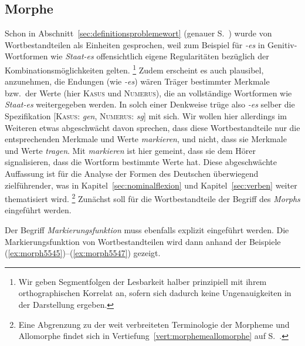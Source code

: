 \subsection{Morphe}

\label{sec:morphe}

Schon in Abschnitt~\ref{sec:definitionsproblemewort} (genauer S.~\pageref{arbref:9234645}) wurde von Wortbestandteilen als Einheiten gesprochen, weil zum Beispiel für \textit{-es} in Genitiv-Wortformen wie \textit{Staat-es} offensichtlich eigene Regularitäten bezüglich der Kombinationsmöglichkeiten gelten.%
\footnote{Wir geben Segmentfolgen der Lesbarkeit halber prinzipiell mit ihrem orthographischen Korrelat an, sofern sich dadurch keine Ungenauigkeiten in der Darstellung ergeben.}
Zudem erscheint es auch plausibel, anzunehmen, die Endungen (wie \textit{-es}) wären Träger bestimmter Merkmale bzw.\ der Werte (hier \textsc{Kasus} und \textsc{Numerus}), die an vollständige Wortformen wie \textit{Staat-es} weitergegeben werden.
In solch einer Denkweise trüge also \textit{-es} selber die Spezifikation [\textsc{Kasus}: \textit{gen}, \textsc{Numerus}: \textit{sg}] mit sich.
Wir wollen hier allerdings im Weiteren etwas abgeschwächt davon sprechen, dass diese Wortbestandteile nur die entsprechenden Merkmale und Werte \textit{markieren}, und nicht, dass sie Merkmale und Werte \textit{tragen}.
Mit \textit{markieren} ist hier gemeint, dass sie dem Hörer signalisieren, dass die Wortform bestimmte Werte hat.
Diese abgeschwächte Auffassung ist für die Analyse der Formen des Deutschen überwiegend zielführender, was in Kapitel~\ref{sec:nominalflexion} und Kapitel~\ref{sec:verben} weiter thematisiert wird.%
\footnote{Eine Abgrenzung zu der weit verbreiteten Terminologie der Morpheme und Allomorphe findet sich in Vertiefung~\ref{vert:morphemeallomorphe} auf S.~\pageref{vert:morphemeallomorphe}.}
Zunächst soll für die Wortbestandteile der Begriff des \textit{Morphs} eingeführt werden.

\Np


Der Begriff \textit{Markierungsfunktion} muss ebenfalls explizit eingeführt werden.
Die Markierungsfunktion von Wortbestandteilen wird dann anhand der Beispiele (\ref{ex:morph5545})--(\ref{ex:morph5547}) gezeigt.


